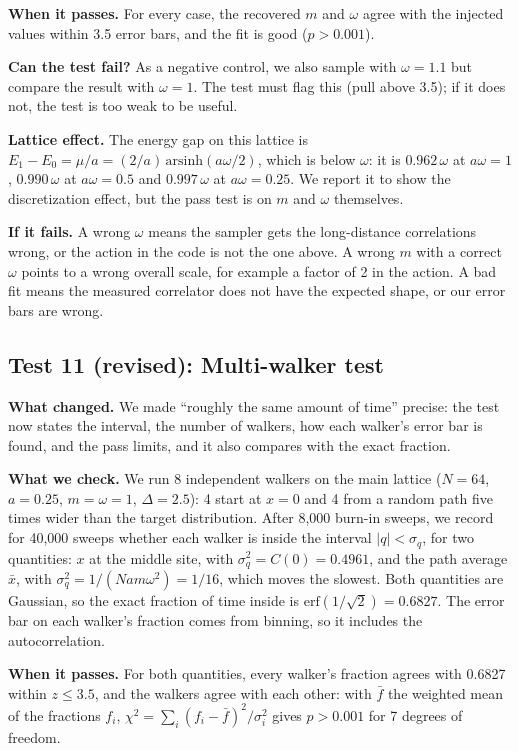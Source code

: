 \documentclass[11pt]{article}
\begin{document}
\textbf{When it passes.} For every case, the recovered $m$ and $\omega$ agree
with the injected values within 3.5 error bars, and the fit is good ($p>0.001$).

\textbf{Can the test fail?} As a negative control, we also sample with
$\omega=1.1$ but compare the result with $\omega=1$. The test must flag this
(pull above 3.5); if it does not, the test is too weak to be useful.

\textbf{Lattice effect.} The energy gap on this lattice is
$E_1-E_0=\mu/a=(2/a)\,\mathrm{arsinh}(a\omega/2)$, which is below $\omega$: it
is $0.962\,\omega$ at $a\omega=1$, $0.990\,\omega$ at $a\omega=0.5$ and
$0.997\,\omega$ at $a\omega=0.25$. We report it to show the discretization
effect, but the pass test is on $m$ and $\omega$ themselves.

\textbf{If it fails.} A wrong $\omega$ means the sampler gets the long-distance
correlations wrong, or the action in the code is not the one above. A wrong $m$
with a correct $\omega$ points to a wrong overall scale, for example a factor of
2 in the action. A bad fit means the measured correlator does not have the
expected shape, or our error bars are wrong.

\subsection*{Test 11 (revised): Multi-walker test}

\textbf{What changed.} We made ``roughly the same amount of time'' precise: the
test now states the interval, the number of walkers, how each walker's error
bar is found, and the pass limits, and it also compares with the exact fraction.

\textbf{What we check.} We run 8 independent walkers on the main lattice
($N=64$, $a=0.25$, $m=\omega=1$, $\Delta=2.5$): 4 start at $x=0$ and 4 from a
random path five times wider than the target distribution. After 8{,}000
burn-in sweeps, we record for 40{,}000 sweeps whether each walker is inside the
interval $|q|<\sigma_q$, for two quantities: $x$ at the middle site, with
$\sigma_q^2=C(0)=0.4961$, and the path average $\bar x$, with
$\sigma_q^2=1/(Nam\omega^2)=1/16$, which moves the slowest. Both quantities are
Gaussian, so the exact fraction of time inside is
$\mathrm{erf}(1/\sqrt2)=0.6827$. The error bar on each walker's fraction comes
from binning, so it includes the autocorrelation.

\textbf{When it passes.} For both quantities, every walker's fraction agrees
with 0.6827 within $z\le3.5$, and the walkers agree with each other: with
$\bar f$ the weighted mean of the fractions $f_i$,
$\chi^2=\sum_i (f_i-\bar f)^2/\sigma_i^2$ gives $p>0.001$ for 7 degrees of
freedom.
\end{document}
